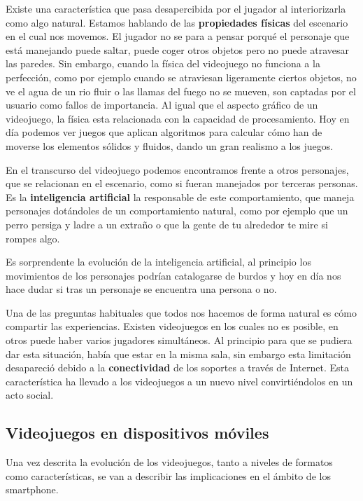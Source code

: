 Existe una característica que pasa desapercibida por el jugador al interiorizarla como algo natural. Estamos hablando de las  \textbf{propiedades físicas} del escenario en el cual nos movemos. El jugador no se para a pensar porqué el personaje que está manejando puede saltar, puede coger otros objetos pero no puede atravesar las paredes. Sin embargo, cuando la física del videojuego no funciona a la perfección, como por ejemplo cuando se atraviesan ligeramente ciertos objetos, no ve el agua de un rio fluir o las llamas del fuego no se mueven, son captadas por el usuario como fallos de importancia. Al igual que el aspecto gráfico de un videojuego, la física esta relacionada con la capacidad de procesamiento. Hoy en día podemos ver juegos que aplican algoritmos para calcular cómo han de moverse los elementos sólidos y fluidos, dando un gran realismo a los juegos.
\newline 

En el transcurso del videojuego podemos encontramos frente a otros personajes, que se relacionan en el escenario, como si fueran manejados por terceras personas. Es la \textbf{inteligencia artificial} la responsable de este comportamiento, que maneja personajes dotándoles de un comportamiento natural, como por ejemplo que un perro persiga y ladre a un extraño o que la gente de tu alrededor te mire si rompes algo. 
\newline

Es sorprendente la evolución de la inteligencia artificial, al principio los movimientos de los personajes podrían catalogarse de burdos y hoy en día nos hace dudar si tras un personaje se encuentra una persona o no.
\newline

Una de las preguntas habituales que todos nos hacemos de forma natural es cómo compartir las experiencias. Existen videojuegos en los cuales no es posible, en otros puede haber varios jugadores simultáneos. Al principio para que se pudiera dar esta situación, había que estar en la misma sala, sin embargo esta limitación desapareció debido a la \textbf{conectividad} de los soportes a través de Internet. Esta característica ha llevado a los videojuegos a un nuevo nivel convirtiéndolos en un acto social.

\subsection{Videojuegos en dispositivos móviles}

Una vez descrita la evolución de los videojuegos, tanto a niveles de formatos como características, se van a describir las implicaciones en el ámbito de los smartphone. 


